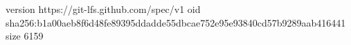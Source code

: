 version https://git-lfs.github.com/spec/v1
oid sha256:b1a00aeb8f6d48fe89395ddadde55dbcae752e95e93840cd57b9289aab416441
size 6159
